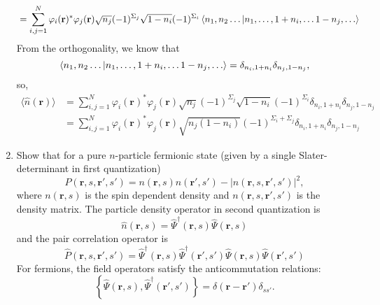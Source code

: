 \documentclass[11pt, a4paper]{article}
\newcommand{\bb}[1]{\mathbf{#1}}
\begin{document}
\begin{enumerate}
\begin{align*}
        & = \sum\limits_{i,j = 1}^N \varphi_i(\bb r)^{*}\varphi_j(\bb r) \sqrt{n_j}(-1)^{\Sigma_j}\sqrt{1-n_i}(-1)^{\Sigma_i}\braket{n_1,n_2 \dots |n_1, \dots, 1+n_i, \dots 1-n_j, \dots}
    \end{align*}
    From the orthogonality, we know that 
    \begin{equation*}
        \braket{n_1,n_2 \dots |n_1, \dots, 1+n_i, \dots 1-n_j, \dots} = \delta_{n_i, 1+n_i}\delta_{n_j, 1-n_j},
    \end{equation*}
    so, 
    \begin{align*}
        \langle \hat n(\bb r) \rangle &= \sum\limits_{i,j = 1}^N \varphi_i(\bb r)^{*}\varphi_j(\bb r) \sqrt{n_j}(-1)^{\Sigma_j}\sqrt{1-n_i}(-1)^{\Sigma_i}\delta_{n_i, 1+n_i}\delta_{n_j, 1-n_j}\\
        & = \sum\limits_{i,j = 1}^N \varphi_i(\bb r)^{*}\varphi_j(\bb r) \sqrt{n_j(1-n_i)}(-1)^{\Sigma_i+\Sigma_j}\delta_{n_i, 1+n_i}\delta_{n_j, 1-n_j}
    \end{align*}
    \item Show that for a pure $n$-particle fermionic state (given by a single Slater-determinant in first quantization)
    \begin{equation*}
        P(\bb r, s, \bb r', s') = n(\bb r, s)n(\bb r', s') - |n(\bb r, s, \bb r', s')|^2,
    \end{equation*}
    where $n(\bb r, s)$ is the spin dependent density and $n(\bb r, s, \bb r', s')$ is the density matrix.
    The particle density operator in second quantization is 
    \begin{equation*}
        \hat n(\bb r, s) = \hat \Psi^{\dagger}(\bb r,s)\hat \Psi(\bb r, s)
    \end{equation*}
    and the pair correlation operator is 
    \begin{equation*}
        \hat P(\bb r, s, \bb r', s') = \hat \Psi^{\dagger}(\bb r,s)\hat \Psi^{\dagger}(\bb r',s')\hat \Psi(\bb r, s)\hat \Psi(\bb r', s')
    \end{equation*}
    For fermions, the field operators satisfy the anticommutation relations:
    \begin{equation*}
        \left\{\hat\Psi(\bb r, s), \hat\Psi^{\dagger}(\bb r', s')\right\} = \delta(\bb r-\bb r')\delta_{ss'}.
    \end{equation*}

\end{enumerate}
\end{document}
